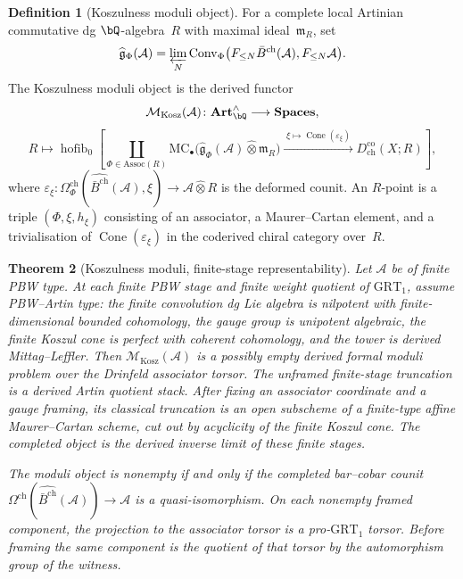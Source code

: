 \documentclass[11pt,reqno]{amsart}
\newtheorem{theorem}{Theorem}[section]
\theoremstyle{definition}
\newtheorem{definition}[theorem]{Definition}
\theoremstyle{remark}
\newcommand{\cA}{\mathcal{A}}
\newcommand{\cM}{\mathcal{M}}
\newcommand{\barBgeom}{\bar{B}^{\mathrm{ch}}}
\numberwithin{equation}{section}
\begin{document}
\begin{definition}[Koszulness moduli object]
\label{def:koszulness-moduli-N1}
For a complete local Artinian commutative dg $\bQ$-algebra~$R$
with maximal ideal~$\mathfrak m_R$, set
\[
\widehat{\mathfrak g}_{\Phi}(\cA)
=
\varprojlim_N
\mathrm{Conv}_{\Phi}\bigl(F_{\leq N}\barBgeom(\cA),
F_{\leq N}\cA\bigr).
\]
The Koszulness moduli object is the derived functor
\[
\cM_{\mathrm{Kosz}}(\cA)\colon
\mathbf{Art}^{\wedge}_{\bQ}\longrightarrow\mathbf{Spaces},
\]
\[
R\longmapsto
\operatorname{hofib}_{0}
\left[
\coprod_{\Phi\in\mathrm{Assoc}(R)}
\mathrm{MC}_{\bullet}\bigl(
\widehat{\mathfrak g}_{\Phi}(\cA)\widehat{\otimes}\mathfrak m_R
\bigr)
\xrightarrow{\;\xi\mapsto\operatorname{Cone}(\varepsilon_\xi)\;}
D^{\mathrm{co}}_{\mathrm{ch}}(X;R)
\right],
\]
where
$\varepsilon_\xi\colon
\Omega^{\mathrm{ch}}_{\Phi}(\widehat{\barBgeom}(\cA),\xi)
\to \cA\widehat{\otimes}R$
is the deformed counit. An $R$-point is a triple
$(\Phi,\xi,h_\xi)$ consisting of an associator, a Maurer--Cartan
element, and a trivialisation of
$\operatorname{Cone}(\varepsilon_\xi)$ in the coderived chiral
category over~$R$.
\end{definition}

\begin{theorem}[Koszulness moduli, finite-stage representability]
\label{thm:meta-as-moduli-N1}
Let $\cA$ be of finite PBW type. At each finite PBW stage and
finite weight quotient of $\mathrm{GRT}_1$, assume PBW--Artin
type: the finite convolution dg Lie algebra is nilpotent with
finite-dimensional bounded cohomology, the gauge group is
unipotent algebraic, the finite Koszul cone is perfect with
coherent cohomology, and the tower is derived Mittag--Leffler.
Then $\cM_{\mathrm{Kosz}}(\cA)$ is a possibly empty derived formal
moduli problem over the Drinfeld associator torsor. The unframed
finite-stage truncation is a derived Artin quotient stack. After
fixing an associator coordinate and a gauge framing, its classical
truncation is an open subscheme of a finite-type affine
Maurer--Cartan scheme, cut out by acyclicity of the finite Koszul
cone. The completed object is the derived inverse limit of these
finite stages.

The moduli object is nonempty if and only if the completed
bar--cobar counit
$\Omega^{\mathrm{ch}}(\widehat{\barBgeom}(\cA))\to\cA$
is a quasi-isomorphism. On each nonempty framed component, the
projection to the associator torsor is a pro-$\mathrm{GRT}_1$
torsor. Before framing the same component is the quotient of that
torsor by the automorphism group of the witness.
\end{theorem}
\end{document}
